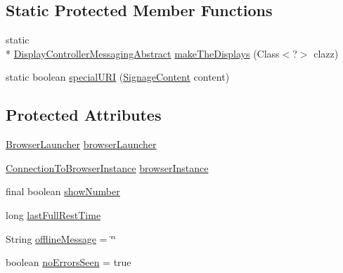 \subsection*{Static Protected Member Functions}
\begin{DoxyCompactItemize}
\item 
static \\*
\hyperlink{classgov_1_1fnal_1_1ppd_1_1dd_1_1display_1_1client_1_1DisplayControllerMessagingAbstract}{Display\-Controller\-Messaging\-Abstract} \hyperlink{classgov_1_1fnal_1_1ppd_1_1dd_1_1display_1_1client_1_1DisplayControllerMessagingAbstract_ad405437545b641b1c4d00d2267209376}{make\-The\-Displays} (Class$<$?$>$ clazz)
\item 
static boolean \hyperlink{classgov_1_1fnal_1_1ppd_1_1dd_1_1display_1_1client_1_1DisplayControllerMessagingAbstract_a78a7e10e4def66421424bd02c69611ab}{special\-U\-R\-I} (\hyperlink{interfacegov_1_1fnal_1_1ppd_1_1dd_1_1signage_1_1SignageContent}{Signage\-Content} content)
\end{DoxyCompactItemize}
\subsection*{Protected Attributes}
\begin{DoxyCompactItemize}
\item 
\hyperlink{classgov_1_1fnal_1_1ppd_1_1dd_1_1display_1_1client_1_1BrowserLauncher}{Browser\-Launcher} \hyperlink{classgov_1_1fnal_1_1ppd_1_1dd_1_1display_1_1client_1_1DisplayControllerMessagingAbstract_a4e93373451e1d06dbf5e0506e4e942a9}{browser\-Launcher}
\item 
\hyperlink{classgov_1_1fnal_1_1ppd_1_1dd_1_1display_1_1client_1_1ConnectionToBrowserInstance}{Connection\-To\-Browser\-Instance} \hyperlink{classgov_1_1fnal_1_1ppd_1_1dd_1_1display_1_1client_1_1DisplayControllerMessagingAbstract_a9aa126a982c0632f38391be7cad4b141}{browser\-Instance}
\item 
final boolean \hyperlink{classgov_1_1fnal_1_1ppd_1_1dd_1_1display_1_1client_1_1DisplayControllerMessagingAbstract_aca138d2835d0f3794bc86261ad550f18}{show\-Number}
\item 
long \hyperlink{classgov_1_1fnal_1_1ppd_1_1dd_1_1display_1_1client_1_1DisplayControllerMessagingAbstract_ad7195dfea86f9821bea794e23a9642ca}{last\-Full\-Rest\-Time}
\item 
String \hyperlink{classgov_1_1fnal_1_1ppd_1_1dd_1_1display_1_1client_1_1DisplayControllerMessagingAbstract_a6c6ececd9f4e0f03ff305dedcc8d81cf}{offline\-Message} = \char`\"{}\char`\"{}
\item 
boolean \hyperlink{classgov_1_1fnal_1_1ppd_1_1dd_1_1display_1_1client_1_1DisplayControllerMessagingAbstract_ad9efc61d6643e94dc2e6d8bc144e43a2}{no\-Errors\-Seen} = true
\end{DoxyCompactItemize}
